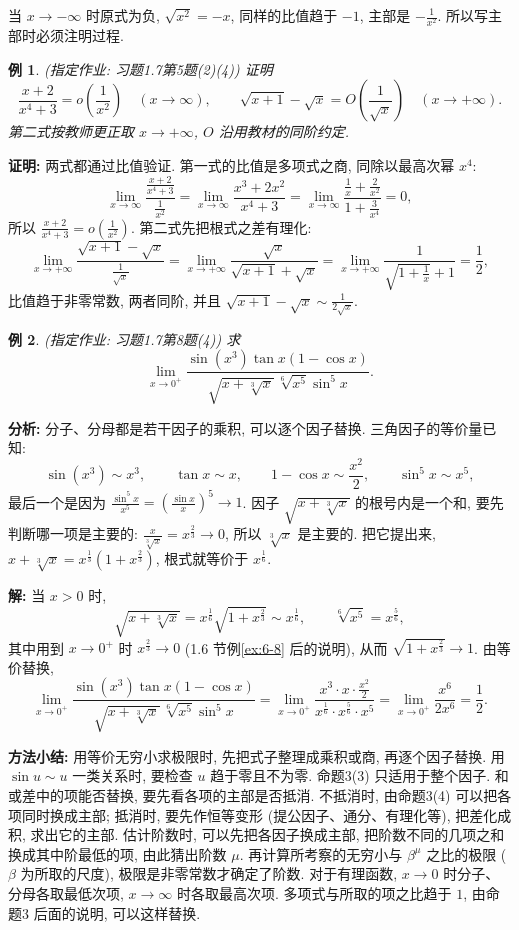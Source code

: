 \documentclass[UTF8,openany]{ctexbook}
\theoremstyle{chinesetextbook}
\newtheorem{example}{例}[section]
\newenvironment{cnproof}{\par\indent\textbf{证明:} \ignorespaces}{\par}
\newenvironment{cnsolution}{\par\indent\textbf{解:} \ignorespaces}{\par}
\begin{document}
当 $x\to-\infty$ 时原式为负, $\sqrt{x^2}=-x$, 同样的比值趋于 $-1$, 主部是 $\displaystyle-\frac1{x^2}$. 所以写主部时必须注明过程.
\begin{example}
\textnormal{(指定作业: 习题1.7第5题(2)(4))} 证明
\[
\frac{x+2}{x^4+3}=o\!\left(\frac1{x^2}\right)\quad(x\to\infty),\qquad\sqrt{x+1}-\sqrt x=O\!\left(\frac1{\sqrt x}\right)\quad(x\to+\infty).
\]
第二式按教师更正取 $x\to+\infty$, $O$ 沿用教材的同阶约定.
\end{example}
\begin{cnproof}
两式都通过比值验证. 第一式的比值是多项式之商, 同除以最高次幂 $x^4$:
\[
\lim_{x\to\infty}\frac{\frac{x+2}{x^4+3}}{\frac1{x^2}}=\lim_{x\to\infty}\frac{x^3+2x^2}{x^4+3}=\lim_{x\to\infty}\frac{\frac1x+\frac2{x^2}}{1+\frac3{x^4}}=0,
\]
所以 $\displaystyle\frac{x+2}{x^4+3}=o\!\left(\frac1{x^2}\right)$. 第二式先把根式之差有理化:
\[
\lim_{x\to+\infty}\frac{\sqrt{x+1}-\sqrt x}{\frac1{\sqrt x}}=\lim_{x\to+\infty}\frac{\sqrt x}{\sqrt{x+1}+\sqrt x}=\lim_{x\to+\infty}\frac1{\sqrt{1+\frac1x}+1}=\frac12,
\]
比值趋于非零常数, 两者同阶, 并且 $\displaystyle\sqrt{x+1}-\sqrt x\sim\frac1{2\sqrt x}$.
\end{cnproof}
\begin{example}
\textnormal{(指定作业: 习题1.7第8题(4))} 求
\[
\lim_{x\to0^+}\frac{\sin(x^3)\tan x(1-\cos x)}{\sqrt{x+\sqrt[3]x}\,\sqrt[6]{x^5}\sin^5x}.
\]
\end{example}
\par\indent\textbf{分析:} 分子、分母都是若干因子的乘积, 可以逐个因子替换. 三角因子的等价量已知:
\[
\sin(x^3)\sim x^3,\qquad\tan x\sim x,\qquad1-\cos x\sim\frac{x^2}2,\qquad\sin^5x\sim x^5,
\]
最后一个是因为 $\displaystyle\frac{\sin^5x}{x^5}=\left(\frac{\sin x}x\right)^5\to1$. 因子 $\sqrt{x+\sqrt[3]x}$ 的根号内是一个和, 要先判断哪一项是主要的: $\displaystyle\frac x{\sqrt[3]x}=x^{\frac23}\to0$, 所以 $\sqrt[3]x$ 是主要的. 把它提出来, $x+\sqrt[3]x=x^{\frac13}\left(1+x^{\frac23}\right)$, 根式就等价于 $x^{\frac16}$.
\begin{cnsolution}
当 $x>0$ 时,
\[
\sqrt{x+\sqrt[3]x}=x^{\frac16}\sqrt{1+x^{\frac23}}\sim x^{\frac16},\qquad\sqrt[6]{x^5}=x^{\frac56},
\]
其中用到 $x\to0^+$ 时 $x^{\frac23}\to0$ (1.6 节例\ref{ex:6-8} 后的说明), 从而 $\sqrt{1+x^{\frac23}}\to1$. 由等价替换,
\[
\lim_{x\to0^+}\frac{\sin(x^3)\tan x(1-\cos x)}{\sqrt{x+\sqrt[3]x}\,\sqrt[6]{x^5}\sin^5x}=\lim_{x\to0^+}\frac{x^3\cdot x\cdot\frac{x^2}2}{x^{\frac16}\cdot x^{\frac56}\cdot x^5}=\lim_{x\to0^+}\frac{x^6}{2x^6}=\frac12.
\]
\end{cnsolution}
\par\indent\textbf{方法小结:} 用等价无穷小求极限时, 先把式子整理成乘积或商, 再逐个因子替换. 用 $\sin u\sim u$ 一类关系时, 要检查 $u$ 趋于零且不为零. 命题3(3) 只适用于整个因子. 和或差中的项能否替换, 要先看各项的主部是否抵消. 不抵消时, 由命题3(4) 可以把各项同时换成主部; 抵消时, 要先作恒等变形 (提公因子、通分、有理化等), 把差化成积, 求出它的主部. 估计阶数时, 可以先把各因子换成主部, 把阶数不同的几项之和换成其中阶最低的项, 由此猜出阶数 $\mu$. 再计算所考察的无穷小与 $\beta^\mu$ 之比的极限 ($\beta$ 为所取的尺度), 极限是非零常数才确定了阶数. 对于有理函数, $x\to0$ 时分子、分母各取最低次项, $x\to\infty$ 时各取最高次项. 多项式与所取的项之比趋于 $1$, 由命题3 后面的说明, 可以这样替换.
\end{document}
